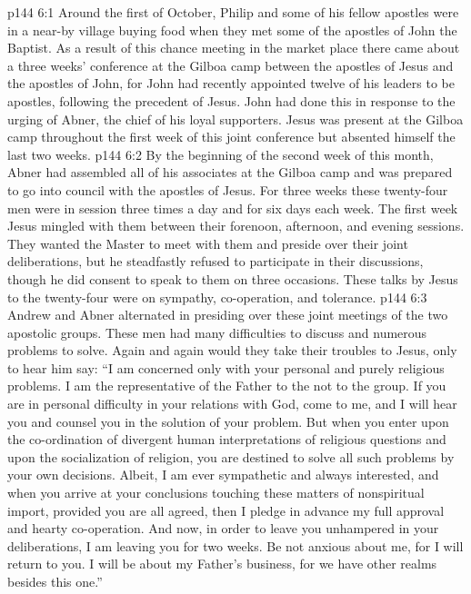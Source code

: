 \vs p144 6:1 Around the first of October, Philip and some of his fellow apostles were in a near\hyp{}by village buying food when they met some of the apostles of John the Baptist. As a result of this chance meeting in the market place there came about a three weeks’ conference at the Gilboa camp between the apostles of Jesus and the apostles of John, for John had recently appointed twelve of his leaders to be apostles, following the precedent of Jesus. John had done this in response to the urging of Abner, the chief of his loyal supporters. Jesus was present at the Gilboa camp throughout the first week of this joint conference but absented himself the last two weeks.
\vs p144 6:2 By the beginning of the second week of this month, Abner had assembled all of his associates at the Gilboa camp and was prepared to go into council with the apostles of Jesus. For three weeks these twenty\hyp{}four men were in session three times a day and for six days each week. The first week Jesus mingled with them between their forenoon, afternoon, and evening sessions. They wanted the Master to meet with them and preside over their joint deliberations, but he steadfastly refused to participate in their discussions, though he did consent to speak to them on three occasions. These talks by Jesus to the twenty\hyp{}four were on sympathy, co\hyp{}operation, and tolerance.\plusone
\vs p144 6:3 Andrew and Abner alternated in presiding over these joint meetings of the two apostolic groups. These men had many difficulties to discuss and numerous problems to solve. Again and again would they take their troubles to Jesus, only to hear him say: \textcolor{ubdarkred}{“I am concerned only with your personal and purely religious problems. I am the representative of the Father to the  not to the group. If you are in personal difficulty in your relations with God, come to me, and I will hear you and counsel you in the solution of your problem. But when you enter upon the co\hyp{}ordination of divergent human interpretations of religious questions and upon the socialization of religion, you are destined to solve all such problems by your own decisions. Albeit, I am ever sympathetic and always interested, and when you arrive at your conclusions touching these matters of nonspiritual import, provided you are all agreed, then I pledge in advance my full approval and hearty co\hyp{}operation. And now, in order to leave you unhampered in your deliberations, I am leaving you for two weeks. Be not anxious about me, for I will return to you. I will be about my Father’s business, for we have other realms besides this one.”}
